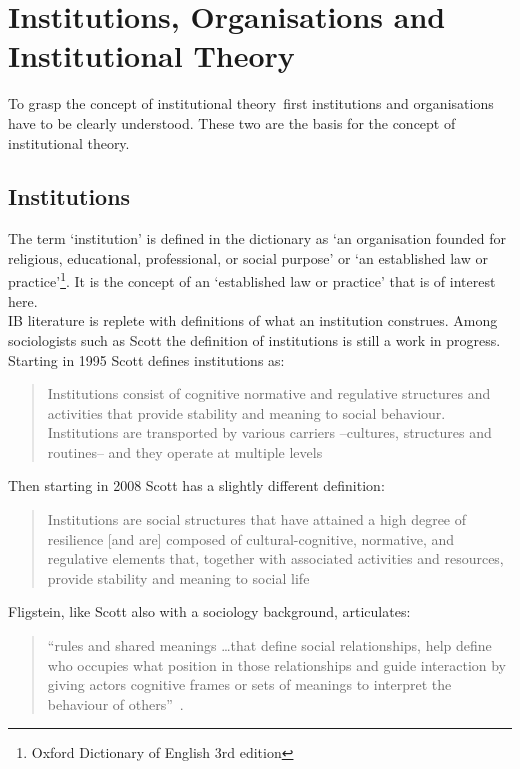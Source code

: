 \section{Institutions, Organisations and Institutional Theory}\label{sec:InTh}

\newcommand{\inth}{institutional theory}
To grasp the concept of \inth~first institutions and organisations have to be clearly understood. These two are the basis for the concept of \inth.

\subsection{Institutions}

The term `institution' is defined in the dictionary as `an organisation founded for  religious, educational, professional, or social purpose' or `an established law or practice'\footnote{Oxford Dictionary of English 3rd edition}.
It is the concept of an `established law or practice' that is of interest here.\\
IB literature is replete with definitions of what an institution construes.
Among sociologists such as Scott the definition of institutions is still a work in progress.
Starting in 1995 Scott defines institutions as: 
\begin{quote}Institutions consist of cognitive normative and regulative structures and activities that provide stability and meaning to social behaviour. Institutions are transported by various carriers --cultures, structures and routines-- and they operate at multiple levels 
~\citep{Scott:1995}
\end{quote}
Then starting in 2008 Scott has a slightly different definition:
\begin{quote}
Institutions are social structures that have attained a high degree of resilience [and are] composed of cultural-cognitive, normative, and regulative elements that, together with associated activities and resources, provide stability and meaning to social life~\citep{Scott:2010us,Scott:2008}
\end{quote}

Fligstein, like Scott also with a sociology background, articulates:
 \begin{quote} ``rules and shared meanings \ldots that define social relationships, help define who occupies what position in those relationships and guide interaction by giving actors cognitive frames or sets of meanings to interpret the behaviour of others''~\citep{Fligstein:2001dj}.
\end{quote}

